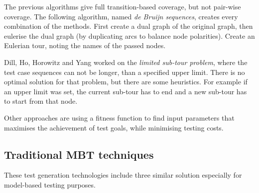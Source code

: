 The previous algorithms give full transition-based coverage, but not pair-wise coverage. The following algorithm, named \textit{de Bruijn sequences}, creates every combination of the methods. First create a dual graph of the original graph, then eulerise the dual graph (by duplicating arcs to balance node polarities). Create an Eulerian tour, noting the names of the passed nodes.

Dill, Ho, Horowitz and Yang worked on the \textit{limited sub-tour problem}, where the test case sequences can not be longer, than a specified upper limit. There is no optimal solution for that problem, but there are some heuristics. For example if an upper limit was set, the current sub-tour has to end and a new sub-tour has to start from that node.

Other approaches are using a fitness function to find input parameters that maximises the achievement of test goals, while minimising testing costs.


\subsection{Traditional MBT techniques}
\label{sub:modelchecking}

These test generation technologies include three similar solution especially for model-based testing purposes.

